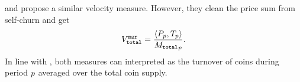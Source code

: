 \cite{athey2016bitcoin} and \cite{kalodner2017blocksci} propose a similar
velocity measure. %
However, they clean the price sum from self-churn and get %
%
%
\begin{align}%
  \VTotalEst = \frac{\langle\Pp,\Tp\rangle}{\MTotalP}.%
\end{align}%
%
In line with , both measures can interpreted as the turnover
of coins during period ${p}$ averaged over the total coin supply. %


